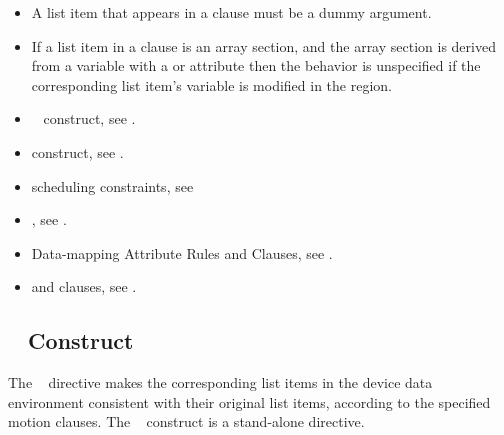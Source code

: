 \begin{itemize}
\fortranspecificstart
\item A list item that appears in a  clause must be a dummy
  argument.
\item If a list item in a  clause is an array section, and the array section is derived from a variable with a  or  attribute then the behavior is unspecified if the corresponding list item's variable is modified in the region.
\fortranspecificend
\end{itemize}

\crossreferences
\begin{itemize}
\item {}~ construct, see 
.

\item {} construct, see 
.

\item {} scheduling constraints, see 

\item {}, see 
. 

\item Data-mapping Attribute Rules and Clauses, see 
.

\item {} and  clauses, see 
.

\end{itemize}









\subsection{~ Construct}
\label{subsec:target update Construct}
\summary
The ~ directive makes the corresponding list items in the device data 
environment consistent with their original list items, according to the specified motion 
clauses. The ~ construct is a stand-alone directive.


